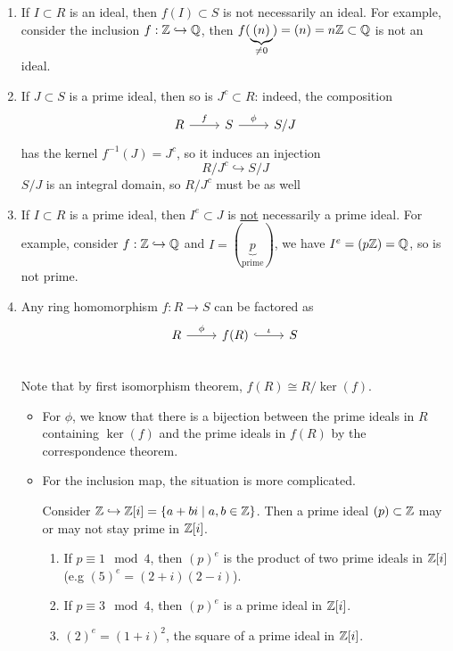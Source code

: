 \documentclass[x11names,reqno,14pt]{extarticle}
\begin{document}
\rem

\begin{enumerate}

\item If $I \subset R$ is an ideal, then $f(I)\subset S$ is not necessarily an ideal. For example, consider the inclusion $f:\mathbb{Z}\hookrightarrow\mathbb{Q}$, then $f(\underbrace{(n)}_{\neq0}) = (n) = n\mathbb{Z}\subset\mathbb{Q}$ is not an ideal. 

\item If $J \subset S$ is a prime ideal, then so is $J^c\subset R$: indeed, the composition 
\[
\begin{tikzcd}
R\ar[r, "f"]&S\ar[r, "\phi"]& S/J
\end{tikzcd}
\]
has the kernel $f^{-1}(J) = J^c$, so it induces an injection 
\[
R/J^c\hookrightarrow S/J
\]
$S/J$ is an integral domain, so $R/J^c$ must be as well 

\item If $I\subset R$ is a prime ideal, then $I^e\subset J$ is \underline{not} necessarily a prime ideal. For example, consider $f:\mathbb{Z}\hookrightarrow\mathbb{Q}$ and $I = (\underbrace{p}_{\text{prime}})$, we have $I^e = (p\mathbb{Z}) = \mathbb{Q}$, so is not prime. 

\item Any ring homomorphism $f:R\to S$ can be factored as 
\[
\begin{tikzcd}
R\ar[r, "\phi"] & f(R) \ar[r, hook, "\iota"] & S \\
\end{tikzcd}
\]
Note that by first isomorphism theorem, $f(R) \cong R/\ker(f)$. 

\begin{itemize}
\item For $\phi$, we know that there is a bijection between the prime ideals in $R$ containing $\ker(f)$ and the prime ideals in $f(R)$ by the correspondence theorem. 

\item For the inclusion map, the situation is more complicated. 

\exm Consider $\mathbb{Z}\hookrightarrow\mathbb{Z}[i] = \{a + bi \mid a, b \in \mathbb{Z}\}$. Then a prime ideal $(p)\subset\mathbb{Z}$ may or may not stay prime in $\mathbb{Z}[i]$.
\begin{enumerate}[label=(\roman*)] 
\item If $p \equiv 1 \mod 4$, then $(p)^e$ is the product of two prime ideals in $\mathbb{Z}[i]$ (e.g $(5)^e = (2 + i)(2 - i)$).

\item If $p \equiv 3 \mod 4$, then $(p)^e$ is a prime ideal in $\mathbb{Z}[i]$. 

\item $(2)^e = (1 + i)^2$, the square of a prime ideal in $\mathbb{Z}[i]$.
\end{enumerate}
\end{itemize}



\end{enumerate}
\end{document}
